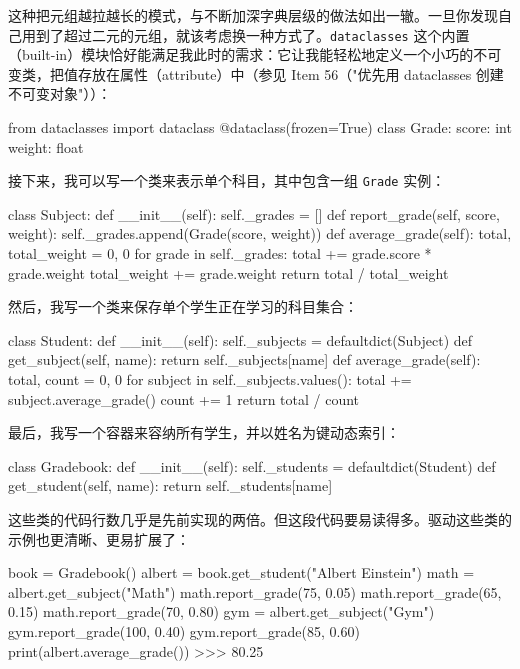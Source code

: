 这种把元组越拉越长的模式，与不断加深字典层级的做法如出一辙。一旦你发现自己用到了超过二元的元组，就该考虑换一种方式了。\texttt{dataclasses} 这个内置（built-in）模块恰好能满足我此时的需求：它让我能轻松地定义一个小巧的不可变类，把值存放在属性（attribute）中（参见 Item 56（"优先用 dataclasses 创建不可变对象"））：

\begin{codebox}[python]
from dataclasses import dataclass
@dataclass(frozen=True)
class Grade:
    score: int
    weight: float
\end{codebox}

接下来，我可以写一个类来表示单个科目，其中包含一组 \texttt{Grade} 实例：

\begin{codebox}[python]
class Subject:
    def __init__(self):
        self._grades = []
    def report_grade(self, score, weight):
        self._grades.append(Grade(score, weight))
    def average_grade(self):
        total, total_weight = 0, 0
        for grade in self._grades:
            total += grade.score * grade.weight
            total_weight += grade.weight
        return total / total_weight
\end{codebox}

然后，我写一个类来保存单个学生正在学习的科目集合：

\begin{codebox}[python]
class Student:
    def __init__(self):
        self._subjects = defaultdict(Subject)
    def get_subject(self, name):
        return self._subjects[name]
    def average_grade(self):
        total, count = 0, 0
        for subject in self._subjects.values():
            total += subject.average_grade()
            count += 1
        return total / count
\end{codebox}

最后，我写一个容器来容纳所有学生，并以姓名为键动态索引：

\begin{codebox}[python]
class Gradebook:
    def __init__(self):
        self._students = defaultdict(Student)
    def get_student(self, name):
        return self._students[name]
\end{codebox}

这些类的代码行数几乎是先前实现的两倍。但这段代码要易读得多。驱动这些类的示例也更清晰、更易扩展了：

\begin{codebox}[python]
book = Gradebook()
albert = book.get_student("Albert Einstein")
math = albert.get_subject("Math")
math.report_grade(75, 0.05)
math.report_grade(65, 0.15)
math.report_grade(70, 0.80)
gym = albert.get_subject("Gym")
gym.report_grade(100, 0.40)
gym.report_grade(85, 0.60)
print(albert.average_grade())
>>>
80.25
\end{codebox}

